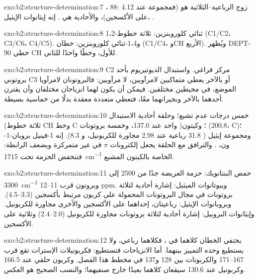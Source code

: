 \begin{solution}{exo:b2:structure-determination:7}
، 88: زوج الرباعية--الثلاثية هو  (فمجموعة  عند 4.12 على الأكسجين)، 
والأحادية هي . إنه إيثانوات الإيثيل، .
\end{solution}

\begin{solution}{exo:b2:structure-determination:8}
1،2-ثنائي كلوروبنزين: ثلاثة خطوط (C1/C2، C3/C6، C4/C5). و1،4-ثنائي كلوروبنزين: خطان (C1/C4، 
وCH الأربع). ويُظهر DEPT-90 خطي CH للأول، وخطًا واحدًا للثاني.
\end{solution}

\begin{solution}{exo:b2:structure-determination:9}
C2 مركز فراغي. واستبدال الديوتيريوم بأحد بروتوني C3 أو بالآخر يعطي
متماكبين لامرآويين، لا مرآويين: فالبروتونان لامرآويا الموضع، في محيطين مختلفين.
فيمكن أن يكون لهما انزياحان مختلفان وأن يقترن أحدهما بالآخر وبجيرانهما معًا، فتعطي
 متعددة معقدة بدلًا من خماسية بسيطة.
\end{solution}

\begin{solution}{exo:b2:structure-determination:10}
خمس درجات عدم تشبع؛ وحلقة أحادية الاستبدال (ثلاثة خطوط CH وخط C واحد عند 137.0، وخمسة
بروتونات )؛ وكيتون (200.8، C)؛ ومجموعة إيثيل ( 31.8 رباعية عند 2.98 مجاورة للكربونيل، و
8.3). إنه 1-فينيل بروبان-1-ون، . والترافق مع الحلقة يجعل إلكترونات $\pi$ في 
غير متمركزة ويضعف الرابطة: فتنخفض الحزمة تحت \qty{1715}{cm^{-1}} الخاصة بالكيتون المشبع.
\end{solution}

\begin{solution}{exo:b2:structure-determination:11}
حمض البنتانويك: حزمة  العريضة جدًا من 2500 إلى \qty{3300}{cm^{-1}} وبروتون قرب 11--12
ppm. وبيوتانوات الميثيل: إشارة أحادية لثلاثة بروتونات في مجال البروتونات المحمولة على كربون مرتبط بأكسجين
(3.3--4.5). وبروبانوات الإيثيل: رباعيتان، إحداهما على الأكسجين والأخرى مجاورة للكربونيل. وإيثانوات
البروبيل: إشارة أحادية لثلاثة بروتونات مجاورة للكربونيل (2.0--2.4) وثلاثية على الأكسجين.
\end{solution}

\begin{solution}{exo:b2:structure-determination:12}
يختفي الخطان كلاهما في ، فكلاهما رباعي، ولا يستطيع  وحده التمييز بينهما. أما الانزياحات
فتستطيع: فكربونيلات الإسترات تقع قرب 167--171 والكربونات  بين 128 و137 في مخطط هذا
الفصل. وكربون حلقي عند 166.5 وكربونيل عند 130.6 سيقعان كلاهما بعيدًا خارج صنفيهما؛ 
والنسب الصحيح هو العكس.
\end{solution}

